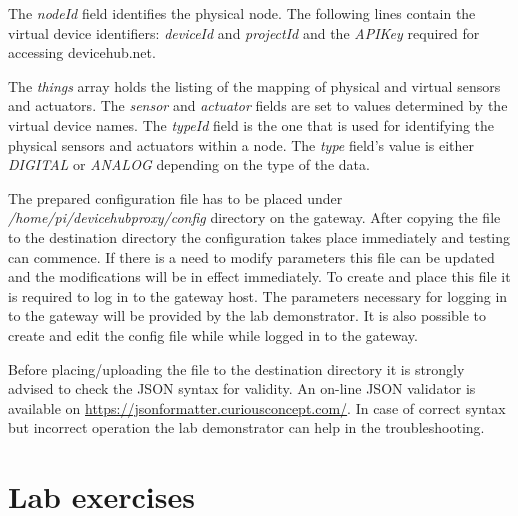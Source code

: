 \documentclass[a4paper]{article}
\begin{document}
The \emph{nodeId} field identifies the physical node. The following lines contain the virtual
device identifiers: \emph{deviceId} and \emph{projectId} and the \emph{APIKey} required for
accessing devicehub.net.

The \emph{things} array holds the listing of the mapping of physical and virtual sensors and
actuators. The \emph{sensor} and \emph{actuator} fields are set to values determined by the
virtual device names. The \emph{typeId} field is the one that is used for identifying the
physical sensors and actuators within a node. The \emph{type} field's value is either \emph{DIGITAL}
or \emph{ANALOG} depending on the type of the data.

The prepared configuration file has to be placed under \emph{/home/pi/devicehubproxy/config}
directory on the gateway. After copying the file to the destination directory the configuration
takes place immediately and testing can commence. If there is a need to modify parameters this
file can be updated and the modifications will be in effect immediately.
To create and place this file it is required to log in to the gateway host. The parameters necessary
for logging in to the gateway will be provided by the lab demonstrator. It is also possible
to create and edit the config file while while logged in to the gateway.

Before placing/uploading the file to the destination directory it is strongly advised to check
the JSON syntax for validity. An on-line JSON validator is available on
\url{https://jsonformatter.curiousconcept.com/}.
In case of correct syntax but incorrect operation the lab demonstrator can help in the troubleshooting.

\appendix

\section{Lab exercises}
\end{document}
